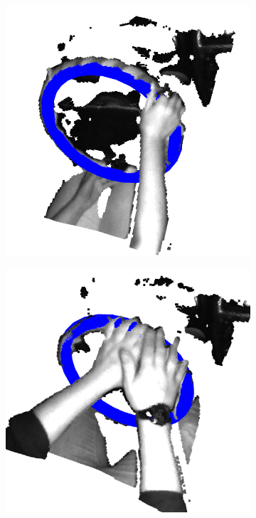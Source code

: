 \begin{figure}[ht]
\begin{subfigure}[t]{0.3\textwidth}
        \includegraphics[width=\textwidth]{media/chapter 3/torus2.png}
    \end{subfigure}\hfill
    \begin{subfigure}[t]{0.3\textwidth}
        \centering
        \includegraphics[width=\textwidth]{media/chapter 3/torus3.png}

\end{subfigure}
\end{figure}
